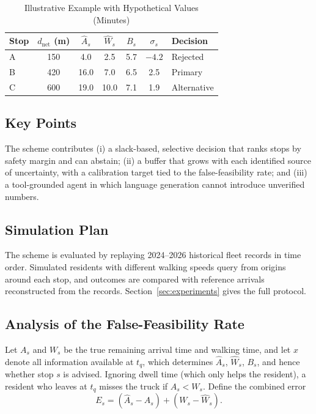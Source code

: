\begin{table}[t]
\caption{Illustrative Example with Hypothetical Values (Minutes)}
\label{tab:example}
\centering
\footnotesize
\begin{tabular}{@{}lcccccl@{}}
\toprule
Stop & $d_{\mathrm{net}}$ (m) & $\hat{A}_s$ & $\hat{W}_s$ & $B_s$ & $\sigma_s$ & Decision \\
\midrule
A & 150 & 4.0 & 2.5 & 5.7 & $-4.2$ & Rejected \\
B & 420 & 16.0 & 7.0 & 6.5 & 2.5 & Primary \\
C & 600 & 19.0 & 10.0 & 7.1 & 1.9 & Alternative \\
\bottomrule
\end{tabular}
\end{table}

\subsection{Key Points}
The scheme contributes (i) a slack-based, selective decision that ranks stops by safety margin and can abstain; (ii) a buffer that grows with each identified source of uncertainty, with a calibration target tied to the false-feasibility rate; and (iii) a tool-grounded agent in which language generation cannot introduce unverified numbers.

\subsection{Simulation Plan}
The scheme is evaluated by replaying 2024--2026 historical fleet records in time order. Simulated residents with different walking speeds query from origins around each stop, and outcomes are compared with reference arrivals reconstructed from the records. Section~\ref{sec:experiments} gives the full protocol.

\subsection{Analysis of the False-Feasibility Rate}\label{subsec:math}
Let $A_s$ and $W_s$ be the true remaining arrival time and walking time, and let $x$ denote all information available at $t_q$, which determines $\hat{A}_s$, $\hat{W}_s$, $B_s$, and hence whether stop $s$ is advised. Ignoring dwell time (which only helps the resident), a resident who leaves at $t_q$ misses the truck if $A_s < W_s$. Define the combined error
\begin{equation}
E_s = (\hat{A}_s - A_s) + (W_s - \hat{W}_s).
\label{eq:error}
\end{equation}

